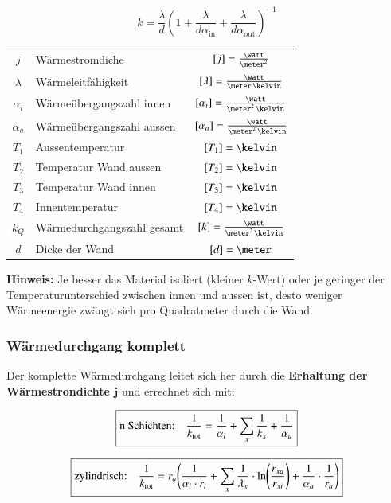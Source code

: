 $$\boxed{k = \frac{\lambda}{d} \left( 1 + \frac{\lambda}{d \alpha_{\text{in}}} + \frac{\lambda}{d \alpha_{\text{out}}} \right)^{-1}}$$
\renewcommand{\arraystretch}{1.3}
\begin{tabular}{c l c}
	$j$ 						& Wärmestromdiche 			& $[j] = \frac{\watt}{\meter^2}$ 								\\
	$\lambda$ 					& Wärmeleitfähigkeit 		& $[\lambda] = \frac{\watt}{\meter \, \kelvin}$ 				\\
	$\alpha_i$ 					& Wärmeübergangszahl innen 	& $[\alpha_i] = \frac{\watt}{\meter^2 \, \kelvin}$				\\
	$\alpha_a$ 					& Wärmeübergangszahl aussen & $[\alpha_a] = \frac{\watt}{\meter^2 \, \kelvin}$				\\
	$T_1$ 						& Aussentemperatur 			& $[T_1] = \kelvin$ 											\\
	$T_2$ 					& Temperatur Wand aussen 	& $[T_2] = \kelvin$ 											\\
	$T_3$ 					& Temperatur Wand innen 	& $[T_3] = \kelvin$ 											\\
	$T_4$ 						& Innentemperatur 			& $[T_4] = \kelvin$ 											\\
	$k_Q$ 						& Wärmedurchgangszahl gesamt		& $[k] = \frac{\watt}{\meter^2 \, \kelvin}$						\\
	$d$ 						& Dicke der Wand 			& $[d] = \meter$
\end{tabular}
\renewcommand{\arraystretch}{1}

\vspace{0.2cm}

\textbf{Hinweis:} Je besser das Material isoliert (kleiner $k$-Wert) oder je geringer der Temperaturunterschied zwischen innen und aussen ist, desto weniger Wärmeenergie zwängt sich pro Quadratmeter durch die Wand.

\subsubsection{Wärmedurchgang komplett}

Der komplette Wärmedurchgang leitet sich her durch die \textbf{Erhaltung der Wärmestrondichte $\bm{j}$} und errechnet sich mit:

$$ \boxed{\text{n Schichten:} \quad \frac{1}{k_{\rm tot}} = \frac{1}{\alpha_i} + \sum_x  \frac{1}{k_x} + \frac{1}{\alpha_a} } $$

$$ \boxed{\text{zylindrisch:} \quad \frac{1}{k_{\rm tot}} = r_a \Biggl( \frac{1}{\alpha_i \cdot r_i} + \sum_x \frac{1}{\lambda_x} \cdot \ln \Biggl( \frac{r_{xa}}{r_{xi}} \Biggr) + \frac{1}{\alpha_a} \cdot \frac{1}{r_a} \Biggr) } $$


